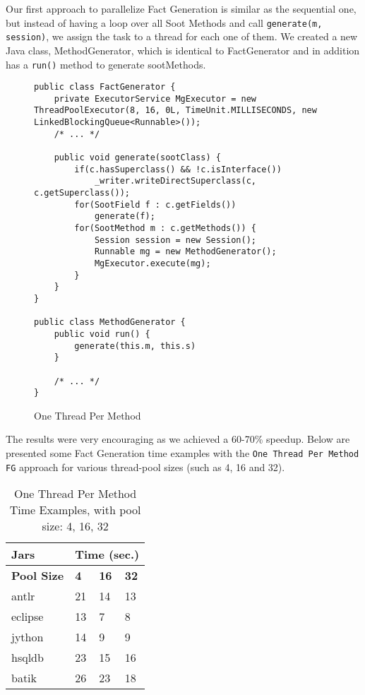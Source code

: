\documentclass{dithesis}
\begin{document}
        Our first approach to parallelize Fact Generation is similar as the sequential one, but instead of having a loop over all Soot Methods and call \texttt{generate(m, session)}, we assign the task to a thread for each one of them. We created a new Java class, MethodGenerator, which is identical to FactGenerator and in addition has a \texttt{run()} method to generate sootMethods.
        \begin{figure}[H]
\begin{lstlisting}
public class FactGenerator {
    private ExecutorService MgExecutor = new ThreadPoolExecutor(8, 16, 0L, TimeUnit.MILLISECONDS, new LinkedBlockingQueue<Runnable>());
    /* ... */

    public void generate(sootClass) {
        if(c.hasSuperclass() && !c.isInterface())
            _writer.writeDirectSuperclass(c, c.getSuperclass());
        for(SootField f : c.getFields())
            generate(f);
        for(SootMethod m : c.getMethods()) {
            Session session = new Session();
            Runnable mg = new MethodGenerator();
            MgExecutor.execute(mg);
        }
    }
}

public class MethodGenerator {
    public void run() {
        generate(this.m, this.s)
    }

    /* ... */
}
\end{lstlisting}
        \caption{One Thread Per Method}
        \end{figure}

        The results were very encouraging as we achieved a 60-70\% speedup. Below are presented some Fact Generation time examples with the \texttt{One Thread Per Method FG} approach for various thread-pool sizes (such as 4, 16 and 32).
		\begin{table}[H]
			\centering
            \begin{tabular}{@{}l|lll@{}}
            \toprule
            \textbf{Jars}    	& \multicolumn{3}{l}{\textbf{Time (sec.)}}  \\ \midrule
            \textbf{Pool Size} 	& \textbf{4}  & \textbf{16}  & \textbf{32}  \\ \midrule
            antlr            	& 21          & 14           & 13           \\
            eclipse          	& 13          & 7            & 8            \\
            jython           	& 14          & 9            & 9            \\
            hsqldb           	& 23          & 15           & 16           \\
            batik            	& 26          & 23           & 18           \\ \bottomrule
            \end{tabular}
            \newline
			\caption[One Thread Per Method Time Examples]{One Thread Per Method Time Examples, with pool size: 4, 16, 32}
		\end{table}
\end{document}
